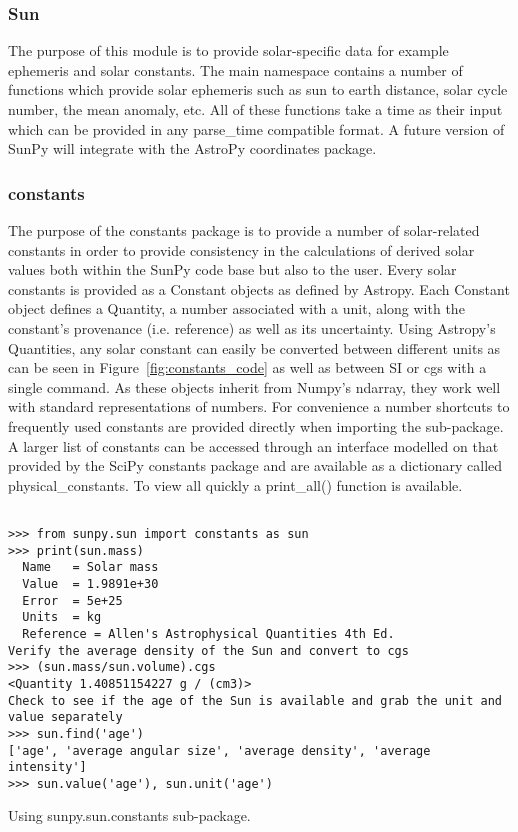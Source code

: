 \subsubsection{Sun}
The purpose of this module is to provide solar-specific data for example ephemeris and
solar constants. The main namespace contains a number of functions which provide solar
ephemeris such as sun to earth distance, solar cycle number, the mean anomaly, etc.
All of these functions take a time as their input which can be provided in any parse_time
compatible format. A future version of SunPy will integrate with the AstroPy coordinates package.


\subsubsection{constants}
The purpose of the constants package is to provide a number of solar-related constants 
in order to provide consistency in the calculations of derived solar values both within the
SunPy code base but also to the user. Every solar constants is provided as a Constant objects as defined by Astropy. 
Each Constant object defines a Quantity, a number associated with a unit, along with the constant's provenance
(i.e. reference) as well as its uncertainty. Using Astropy's Quantities, any solar constant
can easily be converted between different units as can be seen in Figure~\ref{fig:constants_code} as well
as between SI or cgs with a single command.  As these objects inherit from Numpy's ndarray,
they work well with standard representations of numbers.
For convenience a number shortcuts to frequently used constants are provided directly when importing
the sub-package. A larger list of constants can be accessed through an interface modelled 
on that provided by the SciPy constants package and are available as a dictionary called
physical_constants. To view all quickly a print_all() function is available.

\begin{listing}[h]
\begin{verbatim}

>>> from sunpy.sun import constants as sun
>>> print(sun.mass)
  Name   = Solar mass
  Value  = 1.9891e+30
  Error  = 5e+25
  Units  = kg
  Reference = Allen's Astrophysical Quantities 4th Ed.
Verify the average density of the Sun and convert to cgs
>>> (sun.mass/sun.volume).cgs
<Quantity 1.40851154227 g / (cm3)>
Check to see if the age of the Sun is available and grab the unit and value separately
>>> sun.find('age')
['age', 'average angular size', 'average density', 'average intensity']
>>> sun.value('age'), sun.unit('age')

\end{verbatim}
\caption{Using sunpy.sun.constants sub-package.}
\label{code:constants_code}
\end{listing}
	